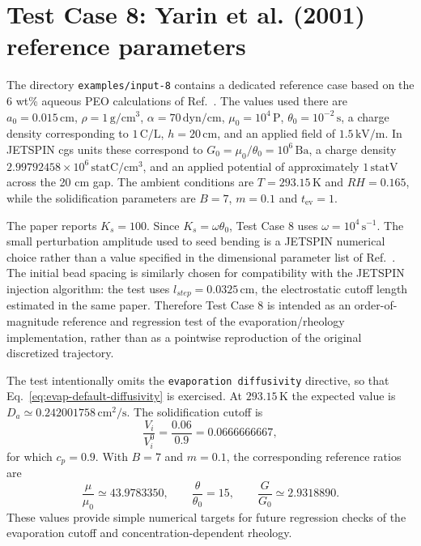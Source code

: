 \section{Test Case 8: Yarin et al. (2001) reference parameters\label{sec:Test-Case-8}}

The directory \texttt{examples/input-8} contains a dedicated reference
case based on the 6 wt\% aqueous PEO calculations of
Ref.~\cite{yarin2001bending}. The values used there are
$a_0=0.015\,\mathrm{cm}$, $\rho=1\,\mathrm{g/cm^3}$,
$\alpha=70\,\mathrm{dyn/cm}$, $\mu_0=10^4\,\mathrm{P}$,
$\theta_0=10^{-2}\,\mathrm{s}$, a charge density corresponding to
$1\,\mathrm{C/L}$, $h=20\,\mathrm{cm}$, and an applied field of
$1.5\,\mathrm{kV/m}$. In JETSPIN cgs units these correspond to
$G_0=\mu_0/\theta_0=10^6\,\mathrm{Ba}$, a charge density
$2.99792458\times10^6\,\mathrm{statC/cm^3}$, and an applied potential
of approximately $1\,\mathrm{statV}$ across the 20 cm gap. The ambient
conditions are $T=293.15\,\mathrm{K}$ and $RH=0.165$, while the
solidification parameters are $B=7$, $m=0.1$ and
$t_{\mathrm{ev}}=1$.

The paper reports $K_s=100$. Since $K_s=\omega\theta_0$, Test Case 8
uses $\omega=10^4\,\mathrm{s^{-1}}$. The small perturbation amplitude
used to seed bending is a JETSPIN numerical choice rather than a value
specified in the dimensional parameter list of Ref.~\cite{yarin2001bending}.
The initial bead spacing is similarly chosen for compatibility with the
JETSPIN injection algorithm: the test uses $l_{step}=0.0325\,\mathrm{cm}$,
the electrostatic cutoff length estimated in the same paper. Therefore
Test Case 8 is intended as an order-of-magnitude reference and regression
test of the evaporation/rheology implementation, rather than as a pointwise
reproduction of the original discretized trajectory.

The test intentionally omits the \texttt{evaporation diffusivity}
directive, so that Eq.~\ref{eq:evap-default-diffusivity} is exercised.
At $293.15\,\mathrm{K}$ the expected value is
$D_a\simeq0.242001758\,\mathrm{cm^2/s}$. The solidification cutoff is
\begin{equation}
 \frac{V_i}{V_i^0}=\frac{0.06}{0.9}=0.0666666667,
\end{equation}
for which $c_p=0.9$. With $B=7$ and $m=0.1$, the corresponding
reference ratios are
\begin{equation}
 \frac{\mu}{\mu_0}\simeq43.9783350,\qquad
 \frac{\theta}{\theta_0}=15,\qquad
 \frac{G}{G_0}\simeq2.9318890.
\end{equation}
These values provide simple numerical targets for future regression
checks of the evaporation cutoff and concentration-dependent rheology.

